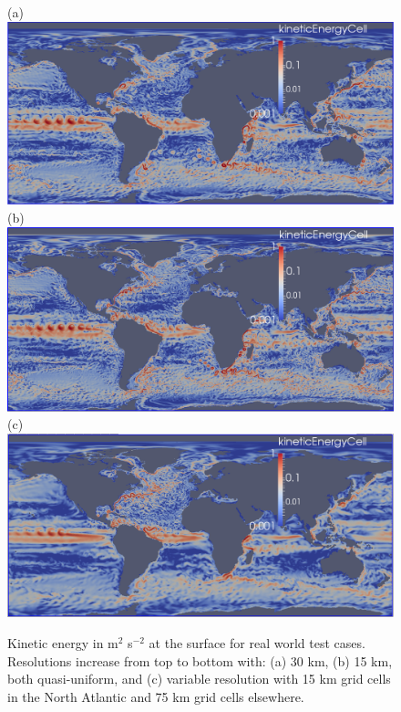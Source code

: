 \begin{figure}[H!]
	\centering
(a)\includegraphics[scale=0.36]{ocean/figures/m72s_30km_yr11_k1_ke.png}\\
(b)\includegraphics[scale=0.36]{ocean/figures/m72r_15km_yr2_k1_ke.png}\\
(c)\includegraphics[scale=0.36]{ocean/figures/m72t_NA_15km_yr11_k1_ke.png}
\caption{Kinetic energy in m$^2$ s$^{-2}$ at the surface for real world test cases.  Resolutions increase from top to bottom with: (a) 30 km, (b) 15 km, both quasi-uniform, and (c) variable resolution with 15 km grid cells in the North Atlantic and 75 km grid cells elsewhere. }
	\label{fig:real_world_ke2}
\end{figure}

